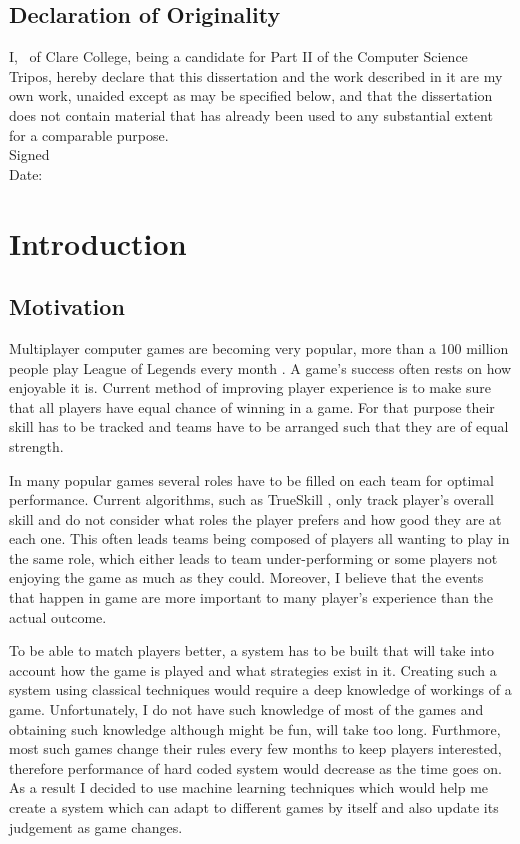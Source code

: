 \documentclass[12pt,a4paper]{book}
\newcommand\college{Clare College}
\begin{document}
\section*{Declaration of Originality}
I, \theauthor\ of \college, being a candidate for Part II of the Computer Science Tripos, hereby declare that this dissertation and the work described in it are my own work, unaided except as may be specified below, and that the dissertation does not contain material that has already been used to any substantial extent for a comparable purpose. %
\\[1\baselineskip]
\noindent Signed 
\\[1\baselineskip]
\noindent Date: \thedate

\clearpage
\tableofcontents
\listoffigures

\mainmatter
\chapter{Introduction}
\section{Motivation}
Multiplayer computer games are becoming very popular, more than a 100 million people play League of Legends every month \cite{league100}.
A game's success often rests on how enjoyable it is.
Current method of improving player experience is to make sure that all players have equal chance of winning in a game.
For that purpose their skill has to be tracked and teams have to be arranged such that they are of equal strength.

In many popular games several roles have to be filled on each team for optimal performance.
Current algorithms, such as TrueSkill \cite{trueskill}, only track player's overall skill and do not consider what roles the player prefers and how good they are at each one.
This often leads teams being composed of players all wanting to play in the same role, which either leads to team under-performing or some players not enjoying the game as much as they could.
Moreover, I believe that the events that happen in game are more important to many player's experience than the actual outcome.

To be able to match players better, a system has to be built that will take into account how the game is played and what strategies exist in it.
Creating such a system using classical techniques would require a deep knowledge of workings of a game.
Unfortunately, I do not have such knowledge of most of the games and obtaining such knowledge although might be fun, will take too long.
Furthmore, most such games change their rules every few months to keep players interested, therefore performance of hard coded system would decrease as the time goes on.
As a result I decided to use machine learning techniques which would help me create a system which can adapt to different games by itself and also update its judgement as game changes.
\end{document}
